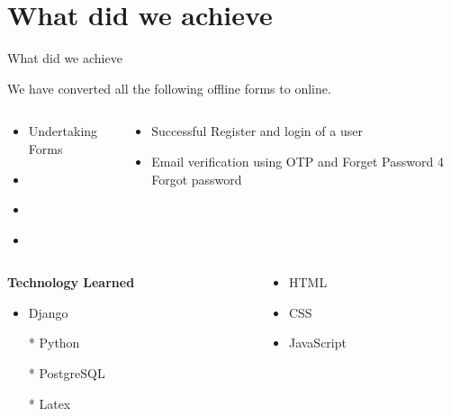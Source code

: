 \documentclass [] {beamer}
\begin{document}
\section{What did we achieve}
\begin{frame}{What did we achieve}


We have converted all the following offline forms to online.

\begin{columns}
    \begin{column}{0.48\textwidth}
\begin{itemize}
    \item Undertaking Forms
    \item \href{https://www.iitb.ac.in/newacadhome/Withdrawalform.pdf}{}
    \item \href{https://www.iitb.ac.in/newacadhome/Bonafidenew.pdf}{}

    \item
    \href{https://www.iitb.ac.in/newacadhome/Reexamnewform.pdf}{}
\end{itemize}

    \end{column}
    \begin{column}{0.48\textwidth}
\begin{itemize}
    \item Successful Register and login of a user
    \item Email verification using OTP and Forget Password
4 Forgot password
\end{itemize}
    \end{column}
\end{columns}
\begin{columns}
    \begin{column}{0.48\textwidth}
        \textbf{Technology Learned }
        \begin{itemize}
            \item Django
            \item[*] Python
            \item[*] PostgreSQL
            \item[*] Latex
        \end{itemize}
    \end{column}
    \begin{column}{0.48\textwidth}
        \begin{itemize}
            \item HTML
            \item CSS
            \item JavaScript
            

\end{itemize}
\end{column}
\end{columns}
\end{frame}
\end{document}
